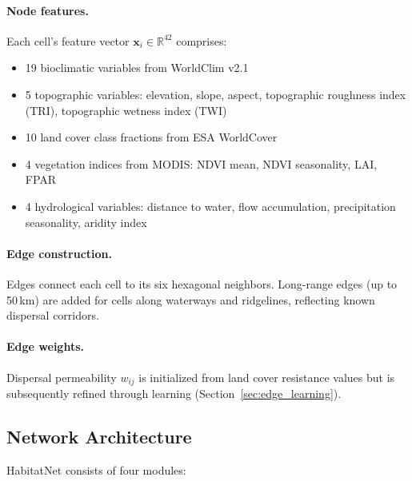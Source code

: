 \documentclass[11pt,a4paper]{article}
\newcommand{\R}{\mathbb{R}}
\begin{document}
\paragraph{Node features.} Each cell's feature vector $\mathbf{x}_i \in
\R^{42}$ comprises:
\begin{itemize}
  \item 19 bioclimatic variables from WorldClim v2.1
    \citep{fick2017worldclim}
  \item 5 topographic variables: elevation, slope, aspect,
    topographic roughness index (TRI), topographic wetness index (TWI)
  \item 10 land cover class fractions from ESA WorldCover
    \citep{zanaga2022esa}
  \item 4 vegetation indices from MODIS: NDVI mean, NDVI seasonality,
    LAI, FPAR
  \item 4 hydrological variables: distance to water, flow accumulation,
    precipitation seasonality, aridity index
\end{itemize}

\paragraph{Edge construction.} Edges connect each cell to its six
hexagonal neighbors. Long-range edges (up to 50\,km) are added for cells
along waterways and ridgelines, reflecting known dispersal corridors.

\paragraph{Edge weights.} Dispersal permeability $w_{ij}$ is initialized
from land cover resistance values but is subsequently refined through
learning (Section~\ref{sec:edge_learning}).

\subsection{Network Architecture}

HabitatNet consists of four modules:
\end{document}
